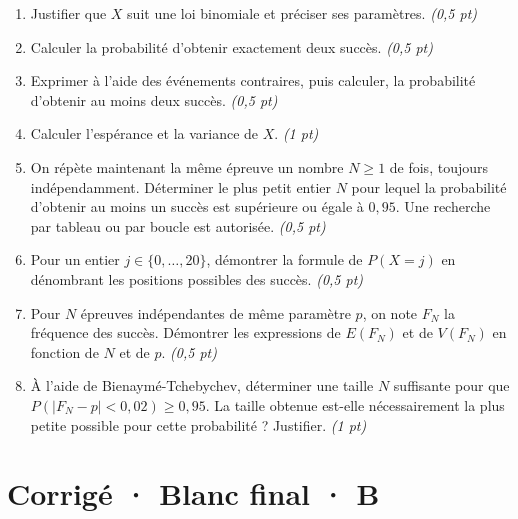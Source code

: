 \begin{enumerate}

\item Justifier que $X$ suit une loi binomiale et préciser ses paramètres. \hfill\textit{(0,5 pt)}

\item Calculer la probabilité d'obtenir exactement deux succès. \hfill\textit{(0,5 pt)}

\item Exprimer à l'aide des événements contraires, puis calculer, la probabilité d'obtenir au moins deux succès. \hfill\textit{(0,5 pt)}

\item Calculer l'espérance et la variance de $X$. \hfill\textit{(1 pt)}

\item On répète maintenant la même épreuve un nombre $N\ge1$ de fois, toujours indépendamment. Déterminer le plus petit entier $N$ pour lequel la probabilité d'obtenir au moins un succès est supérieure ou égale à $0{,}95$. Une recherche par tableau ou par boucle est autorisée. \hfill\textit{(0,5 pt)}

\item Pour un entier $j\in\{0,\ldots,20\}$, démontrer la formule de $P(X=j)$ en dénombrant les positions possibles des succès. \hfill\textit{(0,5 pt)}

\item Pour $N$ épreuves indépendantes de même paramètre $p$, on note $F_N$ la fréquence des succès. Démontrer les expressions de $E(F_N)$ et de $V(F_N)$ en fonction de $N$ et de $p$. \hfill\textit{(0,5 pt)}

\item À l'aide de Bienaymé-Tchebychev, déterminer une taille $N$ suffisante pour que $P(|F_N-p|<0{,}02)\ge0{,}95$. La taille obtenue est-elle nécessairement la plus petite possible pour cette probabilité ? Justifier. \hfill\textit{(1 pt)}

\end{enumerate}

\ifprof\clearpage

\section*{Corrigé · Blanc final · B}\label{cor:9-4}

